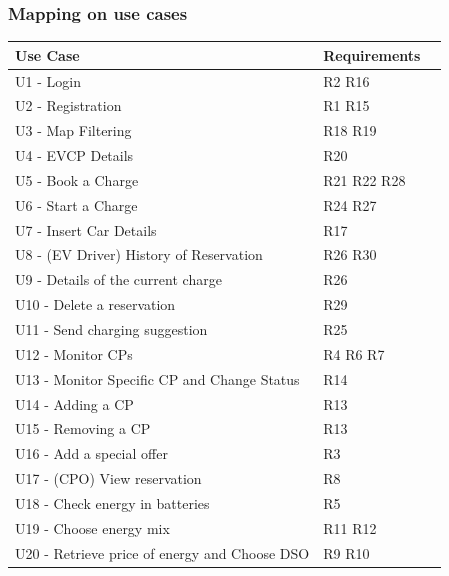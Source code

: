 \subsubsection{Mapping on use cases}
\begin{table}[H]
    \begin{tabularx}{\textwidth}{XXX}
        \toprule
        \textbf{Use Case}                             & \textbf{Requirements} \\ \midrule
        U1 - Login                                    & R2 R16                \\
        U2 - Registration                             & R1 R15                \\
        U3 - Map Filtering                            & R18 R19               \\
        U4 - EVCP Details                             & R20                   \\
        U5 - Book a Charge                            & R21 R22 R28           \\
        U6 - Start a Charge                           & R24 R27               \\
        U7 - Insert Car Details                       & R17                   \\
        U8 - (EV Driver) History of Reservation       & R26 R30               \\
        U9 - Details of the current charge            & R26                   \\
        U10 - Delete a reservation                    & R29                   \\
        U11 - Send charging suggestion                & R25                   \\
        U12 - Monitor CPs                             & R4 R6 R7              \\
        U13 - Monitor Specific CP and Change Status   & R14                   \\
        U14 - Adding a CP                             & R13                   \\
        U15 - Removing a CP                           & R13                   \\
        U16 - Add a special offer                     & R3                    \\
        U17 - (CPO) View reservation                  & R8                    \\
        U18 - Check energy in batteries               & R5                    \\
        U19 - Choose energy mix                       & R11 R12               \\
        U20 - Retrieve price of energy and Choose DSO & R9 R10                \\
        \bottomrule
    \end{tabularx}
\end{table}

